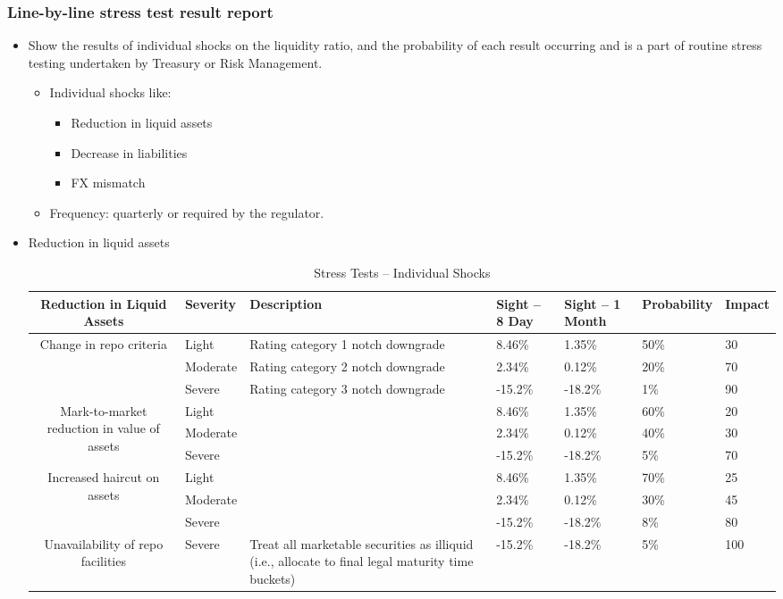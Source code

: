 \subsubsection{Line-by-line stress test result report}
\begin{itemize}
\item Show the results of individual shocks on the liquidity ratio, and the probability of each result occurring and is a part of routine stress testing undertaken by Treasury or Risk Management.
    \begin{itemize}
    \item Individual shocks like:
        \begin{itemize}
        \item Reduction in liquid assets
        \item Decrease in liabilities
        \item FX mismatch
        \end{itemize}
    \item Frequency: quarterly or required by the regulator.
    \end{itemize}
\item Reduction in liquid assets


\begin{table}[ht]
    \centering
    \small
    \begin{tabular}{|c|m{1.5cm}|m{3cm}|m{1.5cm}|m{1.5cm}|m{1.5cm}|m{1.5cm}|}
    \hline
    \textbf{Reduction in Liquid Assets} & \textbf{Severity} & \textbf{Description} & \textbf{Sight – 8 Day} & \textbf{Sight – 1 Month} & \textbf{Probability} & \textbf{Impact} \\
    \hline
    \multirow{3}{*}{Change in repo criteria} 
      & Light & Rating category 1 notch downgrade & 8.46\% & 1.35\% & 50\% & 30 \\
      & Moderate & Rating category 2 notch downgrade & 2.34\% & 0.12\% & 20\% & 70 \\
      & Severe & Rating category 3 notch downgrade & -15.2\% & -18.2\% & 1\% & 90 \\
    \hline
    \multirow{3}{*}{Mark-to-market reduction in value of assets} 
      & Light &  & 8.46\% & 1.35\% & 60\% & 20 \\
      & Moderate &  & 2.34\% & 0.12\% & 40\% & 30 \\
      & Severe &  & -15.2\% & -18.2\% & 5\% & 70 \\
    \hline
    \multirow{3}{*}{Increased haircut on assets} 
      & Light &  & 8.46\% & 1.35\% & 70\% & 25 \\
      & Moderate &  & 2.34\% & 0.12\% & 30\% & 45 \\
      & Severe &  & -15.2\% & -18.2\% & 8\% & 80 \\
    \hline
    Unavailability of repo facilities 
      & Severe & Treat all marketable securities as illiquid (i.e., allocate to final legal maturity time buckets) & -15.2\% & -18.2\% & 5\% & 100 \\
    \hline
    \end{tabular}
    \caption{Stress Tests – Individual Shocks}
\end{table}

\end{itemize}


